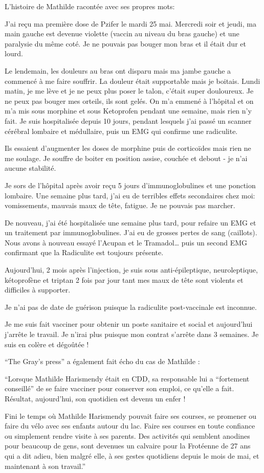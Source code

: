 L'histoire de Mathilde racontée avec ses propres mots:

J'ai reçu ma première dose de Pzifer le mardi 25 mai. Mercredi soir et jeudi, ma
main gauche est devenue violette (vaccin au niveau du bras gauche) et une
paralysie du même coté. Je ne pouvais pas bouger mon bras et il était dur et
lourd.

Le lendemain, les douleurs au bras ont disparu mais ma jambe gauche a commencé à
me faire souffrir. La douleur était supportable mais je boitais. Lundi matin, je
me lève et je ne peux plus poser le talon, c'était super douloureux. Je ne peux
pas bouger mes orteils, ils sont gelés. On m'a emmené à l'hôpital et on m'a mis
sous morphine et sous Ketoprofen pendant une semaine, mais rien n'y fait. Je
suis hospitalisée depuis 10 jours, pendant lesquels j'ai passé un scanner
cérébral lombaire et médullaire, puis un EMG qui confirme une radiculite.

Ils essaient d'augmenter les doses de morphine puis de corticoïdes mais rien ne
me soulage. Je souffre de boiter en position assise, couchée et debout - je n'ai
aucune stabilité.

Je sors de l'hôpital après avoir reçu 5 jours d'immunoglobulines et une ponction
lombaire. Une semaine plus tard, j'ai eu de terribles effets secondaires chez
moi: vomissements, mauvais maux de tête, fatigue. Je ne pouvais pas marcher.

De nouveau, j'ai été hospitalisée une semaine plus tard, pour refaire un EMG et
un traitement par immunoglobulines. J'ai eu de grosses pertes de sang
(caillots). Nous avons à nouveau essayé l'Acupan et le Tramadol… puis un second
EMG confirmant que la Radiculite est toujours présente.

Aujourd'hui, 2 mois après l'injection, je suis sous anti-épileptique,
neuroleptique, kétoprofène et triptan 2 fois par jour tant mes maux de tête sont
violents et difficiles à supporter.

Je n'ai pas de date de guérison puisque la radiculite post-vaccinale est
inconnue.

Je me suis fait vacciner pour obtenir un poste sanitaire et social et
aujourd'hui j'arrête le travail. Je n'irai plus puisque mon contrat s'arrête
dans 3 semaines. Je suis en colère et dégoûtée !

“The Gray's press” a également fait écho du cas de Mathilde :

“Lorsque Mathilde Harismendy était en CDD, sa responsable lui a “fortement
conseillé” de se faire vacciner pour conserver son emploi, ce qu'elle a
fait. Résultat, aujourd'hui, son quotidien est devenu un enfer !

Fini le temps où Mathilde Harismendy pouvait faire ses courses, se promener ou
faire du vélo avec ses enfants autour du lac. Faire ses courses en toute
confiance ou simplement rendre visite à ses parents. Des activités qui semblent
anodines pour beaucoup de gens, sont devenues un calvaire pour la Frotéenne de
27 ans qui a dit adieu, bien malgré elle, à ses gestes quotidiens depuis le mois
de mai, et maintenant à son travail.”

